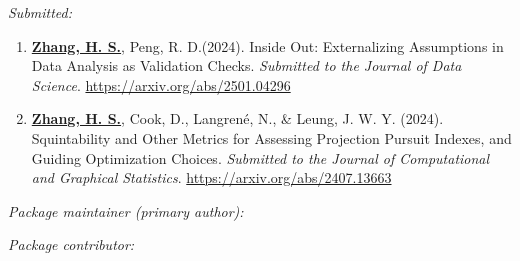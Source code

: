 \documentclass[10pt,a4paper]{article} %
\begin{document}

% 

\noindent\textit{Submitted:}\vspace{-0.5em}
\begin{enumerate}[resume]

    \item \underline{\textbf{Zhang, H. S.}}, Peng, R. D.(2024). Inside Out: Externalizing Assumptions 
    in Data Analysis as Validation Checks. \emph{Submitted to the Journal of Data Science}. 
    \url{https://arxiv.org/abs/2501.04296}
    
    \item \underline{\textbf{Zhang, H. S.}}, Cook, D., Langren\'e, N., \& Leung, J. W. Y. (2024). 
    Squintability and Other Metrics for Assessing Projection Pursuit Indexes, and Guiding 
    Optimization Choices. \emph{Submitted to the Journal of Computational and Graphical 
    Statistics}. \url{https://arxiv.org/abs/2407.13663}
\end{enumerate}


\noindent\textit{Package maintainer (primary author):}

\vspace{0.5em}

 \newline 
{} \newline
{} \newline 

\vspace{1em}
\noindent\textit{Package contributor:}
\end{document}
